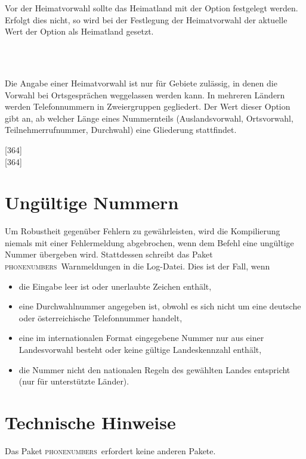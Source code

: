 \documentclass[numbers=noenddot]{scrreprt}
\newcommand*\Paket[1]{\textsc{#1}}
\newcommand\phone{\textcolor{cnltx}{\Paket{phone\-numbers}}}
\newcommand\UeberschriftUngueltig{\section{Ungültige Nummern}}
\begin{document}
\begin{Befehlsliste}
Vor der Heimatvorwahl sollte das Heimatland mit der Option  festgelegt werden. Erfolgt dies nicht, so wird bei der Festlegung der Heimatvorwahl der aktuelle Wert der Option  als Heimatland gesetzt.
\begin{sidebyside}
   \\
   \\
\end{sidebyside}
Die Angabe einer Heimatvorwahl ist nur für Gebiete zulässig, in denen die Vorwahl bei Ortsgesprächen weggelassen werden kann.
In mehreren Ländern werden Telefonnummern in Zweiergruppen gegliedert. Der Wert dieser Option gibt an, ab welcher Länge eines Nummernteils (Auslandsvorwahl, Ortsvorwahl, Teilnehmerrufnummer, Durchwahl) eine Gliederung stattfindet.
\begin{sidebyside}
  [364] \\
  [364]
\end{sidebyside}
\end{Befehlsliste}

\UeberschriftUngueltig
Um Robustheit gegenüber Fehlern zu gewährleisten, wird die Kompilierung niemals mit einer Fehlermeldung abgebrochen, wenn dem Befehl  eine ungültige Nummer übergeben wird. Stattdessen schreibt das Paket \phone\ Warnmeldungen in die Log-Datei.
Dies ist der Fall, wenn
\begin{itemize}
\item die Eingabe leer ist oder unerlaubte Zeichen enthält,
\item eine Durchwahlnummer angegeben ist, obwohl es sich nicht um eine deutsche oder österreichische Telefonnummer handelt,
\item eine im internationalen Format eingegebene Nummer nur aus einer Landesvorwahl besteht oder keine gültige Landeskennzahl enthält,
\item die Nummer nicht den nationalen Regeln des gewählten Landes entspricht (nur für unterstützte Länder).
\end{itemize}

\section{Technische Hinweise}
Das Paket \phone\ erfordert keine anderen Pakete.
\end{document}
